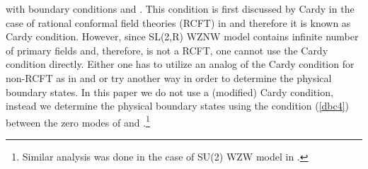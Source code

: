 \documentclass[a4paper,12pt]{article}
\begin{document}
with boundary conditions \coordHE{} and \coordHE{}. This condition is first
discussed by Cardy in the case of rational conformal field theories (RCFT)
in \cite{cardy} and therefore it is known as Cardy condition. However, since
SL(2,R) WZNW model contains infinite number of primary fields and,
therefore, is not a RCFT, one cannot use the Cardy condition directly.
Either one has to utilize an analog of the Cardy condition for non-RCFT as
in \cite{teschner-0} and \cite{teschner} or try another way in order to
determine the physical boundary states. In this paper we do not use a
(modified) Cardy condition, instead we determine the physical boundary
states using the condition (\ref{dbc4}) between the zero modes of \coordHE{}
and \coordHE{}.\footnote{%
Similar analysis was done in the case of SU(2) WZW model in \cite{ishikawa}.}
\end{document}
